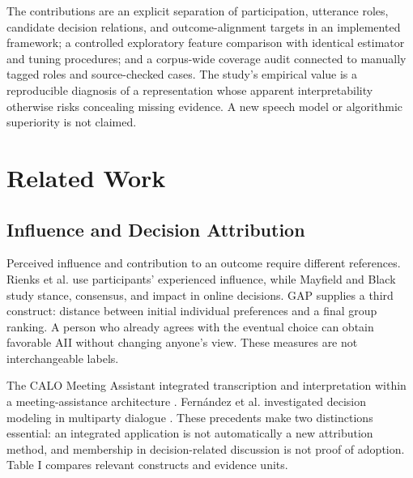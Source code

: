 \documentclass[journal]{IEEEtran}
\begin{document}
The contributions are an explicit separation of participation, utterance roles, candidate decision relations, and outcome-alignment targets in an implemented framework; a controlled exploratory feature comparison with identical estimator and tuning procedures; and a corpus-wide coverage audit connected to manually tagged roles and source-checked cases. The study's empirical value is a reproducible diagnosis of a representation whose apparent interpretability otherwise risks concealing missing evidence. A new speech model or algorithmic superiority is not claimed.

\section{Related Work}
\subsection{Influence and Decision Attribution}
Perceived influence and contribution to an outcome require different references. Rienks et al. use participants' experienced influence, while Mayfield and Black study stance, consensus, and impact in online decisions. GAP supplies a third construct: distance between initial individual preferences and a final group ranking. A person who already agrees with the eventual choice can obtain favorable AII without changing anyone's view. These measures are not interchangeable labels.

The CALO Meeting Assistant integrated transcription and interpretation within a meeting-assistance architecture \cite{ref6}. Fern\'{a}ndez et al. investigated decision modeling in multiparty dialogue \cite{ref7}. These precedents make two distinctions essential: an integrated application is not automatically a new attribution method, and membership in decision-related discussion is not proof of adoption. Table I compares relevant constructs and evidence units.
\end{document}
